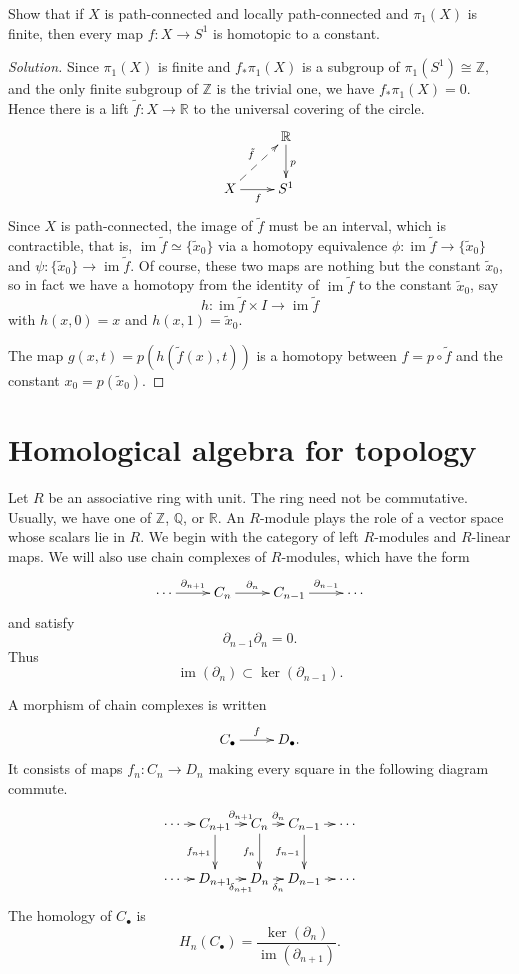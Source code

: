 \begin{exercise}
\label{exercise-maps-to-circle-finite-pi1}
Show that if $X$ is path-connected and
locally path-connected and $\pi_1(X)$ is
finite, then every map $f:X\to S^1$ is
homotopic to a constant.
\end{exercise}

\begin{proof}[Solution]
Since $\pi_1(X)$ is finite and
$f_*\pi_1(X)$ is a subgroup of
$\pi_1(S^1)\cong\mathbb{Z}$, and the only
finite subgroup of $\mathbb{Z}$ is the
trivial one, we have $f_*\pi_1(X)=0$. Hence
there is a lift $\tilde{f}:X\to\mathbb{R}$
to the universal covering of the circle.
$$
\xymatrix{
  & \mathbb{R} \ar[d]^{p} \\
X \ar@{-->}[ur]^{\tilde{f}} \ar[r]_{f}
  & S^1
}
$$
Since $X$ is path-connected, the image of
$\tilde{f}$ must be an interval, which is
contractible, that is,
$\operatorname{im}\tilde{f}\simeq
\{\tilde{x}_0\}$
via a homotopy equivalence
$\phi:\operatorname{im}\tilde{f}\to
\{\tilde{x}_0\}$
and
$\psi:\{\tilde{x}_0\}\to
\operatorname{im}\tilde{f}$.
Of course, these two maps are nothing but
the constant $\tilde{x}_0$, so in fact we
have a homotopy from the identity of
$\operatorname{im}\tilde{f}$ to the
constant $\tilde{x}_0$, say
$$
h:\operatorname{im}\tilde{f}\times I\to
\operatorname{im}\tilde{f}
$$
with $h(x,0)=x$ and $h(x,1)=\tilde{x}_0$.

The map $g(x,t)=p(h(\tilde{f}(x),t))$ is a
homotopy between $f=p\circ\tilde{f}$ and the
constant $x_0=p(\tilde{x}_0)$.
\end{proof}


\section{Homological algebra for topology}
\label{at-section-homological-algebra}

\noindent
Let $R$ be an associative ring with unit.
The ring need not be commutative. Usually,
we have one of
$\mathbb{Z}$, $\mathbb{Q}$, or
$\mathbb{R}$. An $R$-module plays the role
of a vector space whose scalars lie in $R$.
We begin with the category of left
$R$-modules and $R$-linear maps.  We will
also use chain complexes of $R$-modules,
which have the form
$$
\xymatrix{
\cdots \ar[r]^-{\partial_{n+1}}
  & C_n \ar[r]^-{\partial_n}
  & C_{n-1} \ar[r]^-{\partial_{n-1}}
  & \cdots
}
$$
and satisfy
$$
\partial_{n-1}\partial_n=0.
$$
Thus
$$
\operatorname{im}(\partial_n)
\subset
\ker(\partial_{n-1}).
$$

\noindent
A morphism of chain complexes is written
$$
\xymatrix{
C_\bullet \ar[r]^-f & D_\bullet.
}
$$
It consists of maps $f_n:C_n\to D_n$
making every square in the following
diagram commute.
$$
\xymatrix@C=.7em{
\cdots \ar[r]
  & C_{n+1}
    \ar[r]^-{\partial_{n+1}}
    \ar[d]_{f_{n+1}}
  & C_n
    \ar[r]^-{\partial_n}
    \ar[d]_{f_n}
  & C_{n-1}
    \ar[r]
    \ar[d]_{f_{n-1}}
  & \cdots \\
\cdots \ar[r]
  & D_{n+1}
    \ar[r]_-{\delta_{n+1}}
  & D_n
    \ar[r]_-{\delta_n}
  & D_{n-1}
    \ar[r]
  & \cdots
}
$$
The homology of $C_\bullet$ is
$$
H_n(C_\bullet)
=
\frac{\ker(\partial_n)}
{\operatorname{im}(\partial_{n+1})}.
$$

